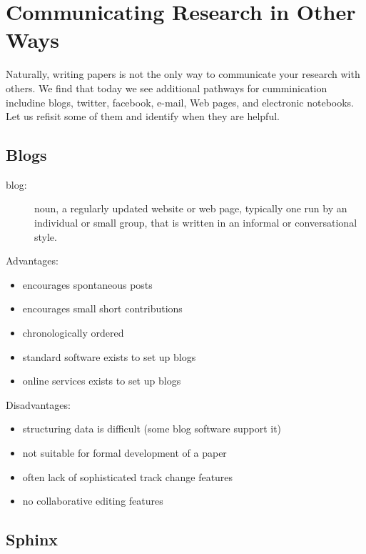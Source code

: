 \FILENAME

\section{Communicating Research in Other Ways}\label{communicating-research}

Naturally, writing papers is not the only way to communicate your
research with others. We find that today we see additional pathways
for cumminication includine blogs, twitter, facebook, e-mail, Web
pages, and electronic notebooks. Let us refisit some of them and
identify when they are helpful.

\subsection{Blogs}\label{blogs}

\begin{description}
\item[blog:]
noun, a regularly updated website or web page, typically one run by an
individual or small group, that is written in an informal or
conversational style.
\end{description}

Advantages:

\begin{itemize}

\item
  encourages spontaneous posts
\item
  encourages small short contributions
\item
  chronologically ordered
\item
  standard software exists to set up blogs
\item
  online services exists to set up blogs
\end{itemize}

Disadvantages:

\begin{itemize}

\item
  structuring data is difficult (some blog software support it)
\item
  not suitable for formal development of a paper
\item
  often lack of sophisticated track change features
\item
  no collaborative editing features
\end{itemize}

\subsection{Sphinx}\label{sphinx}

